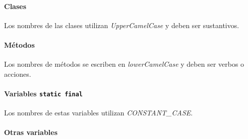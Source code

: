     \paragraph{Clases}
      Los nombres de las clases utilizan \textit{UpperCamelCase} y deben ser sustantivos.
    \paragraph{Métodos}
      Los nombres de métodos se escriben en \textit{lowerCamelCase} y deben ser verbos o 
      acciones.
    \paragraph{Variables \texttt{static final}}
      Los nombres de estas variables utilizan \textit{CONSTANT\_CASE}.
    \paragraph{Otras variables}
      
%